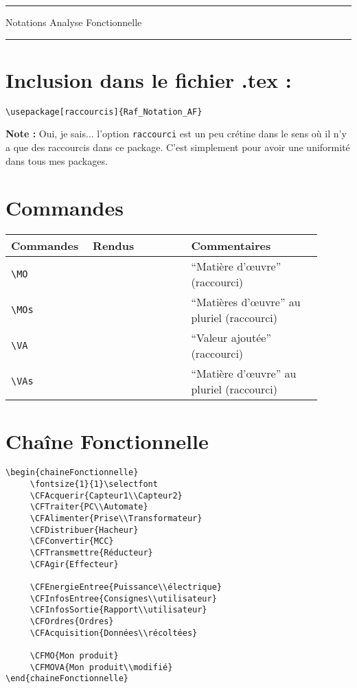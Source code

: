 \documentclass[a4paper,12pt]{article}
\begin{document}
	\begin{center}
		\hrule{\Large Notations Analyse Fonctionnelle}\\\hrule
	\end{center}

	\section{Inclusion dans le fichier .tex :}

		\verb!\usepackage[raccourcis]{Raf_Notation_AF}!

		\textbf{Note :} Oui, je sais... l'option \verb!raccourci! est un peu crétine dans le sens où il n'y a que des raccourcis dans ce package.
								C'est simplement pour avoir une uniformité dans tous mes packages.

	\section{Commandes}

		\noindent
		\begin{tabular}{|p{0.2\linewidth}|p{0.3\linewidth}|p{0.4\linewidth}|}
			\hline
				\textbf{Commandes}&\textbf{Rendus}&\textbf{Commentaires}
			\\\hline\hline
				\verb!\MO!	&	\MO	&	``Matière d'\oe uvre'' (raccourci)
			\\\hline
				\verb!\MOs!	&	\MOs	&	``Matières d'\oe uvre'' au pluriel (raccourci)
			\\\hline
				\verb!\VA!	&	\VA	&	``Valeur ajoutée'' (raccourci)
			\\\hline
				\verb!\VAs!	&	\VAs	&	``Matière d'\oe uvre'' au pluriel (raccourci)
			\\\hline
		\end{tabular}

	\section{Chaîne Fonctionnelle}

	
\begin{verbatim}
\begin{chaineFonctionnelle}
     \fontsize{1}{1}\selectfont
     \CFAcquerir{Capteur1\\Capteur2}
     \CFTraiter{PC\\Automate}
     \CFAlimenter{Prise\\Transformateur}
     \CFDistribuer{Hacheur}
     \CFConvertir{MCC}
     \CFTransmettre{Réducteur}
     \CFAgir{Effecteur}

     \CFEnergieEntree{Puissance\\électrique}
     \CFInfosEntree{Consignes\\utilisateur}
     \CFInfosSortie{Rapport\\utilisateur}
     \CFOrdres{Ordres}
     \CFAcquisition{Données\\récoltées}

     \CFMO{Mon produit}
     \CFMOVA{Mon produit\\modifié}
\end{chaineFonctionnelle}
\end{verbatim}
\end{document}

